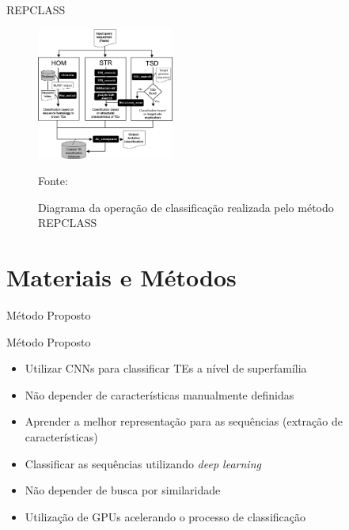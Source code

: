 \documentclass[%
  xcolor=table,%
  10pt,%
  aspectratio = 169,%
  compress,%
  t,%
]{beamer}%
\begin{document}
\begin{frame}{}{REPCLASS}
    \begin{figure}
        \centering
        \includegraphics[width=0.4\textwidth]{./Figuras/workflow-repclass.jpg}
        \caption{Diagrama da operação de classificação realizada pelo método REPCLASS}
        \scriptsize Fonte: \cite{repclass}
    \end{figure}
\end{frame}

\section{Materiais e Métodos}\label{sec:matmet}

\begin{frame}{}{Método Proposto}
    \begin{block}{Método Proposto}
        \begin{itemize}
            \item Utilizar CNNs para classificar TEs a nível de superfamília
            \item Não depender de características manualmente definidas
            \item Aprender a melhor representação para as sequências (extração de características)
            \item Classificar as sequências utilizando \textit{deep learning}
            \item Não depender de busca por similaridade
            \item Utilização de GPUs acelerando o processo de classificação
        \end{itemize}
    \end{block}
\end{frame}
\end{document}
